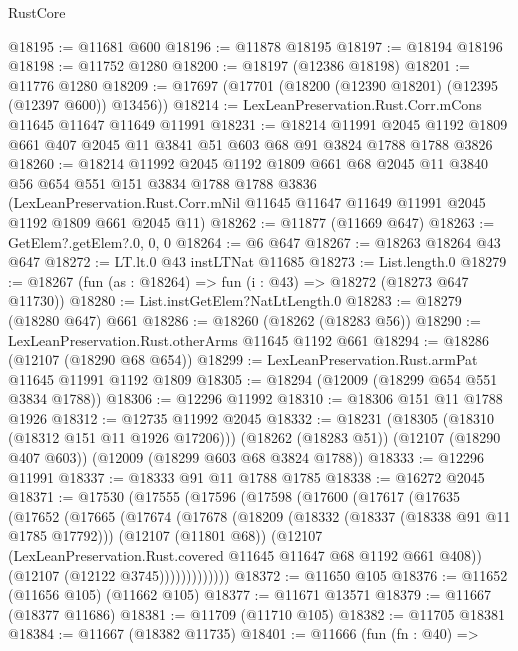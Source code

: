 \begin{lexlean}{RustCore}
\begin{coremodule}
@18195 := @11681 @600
@18196 := @11878 @18195
@18197 := @18194 @18196
@18198 := @11752 @1280
@18200 := @18197 (@12386 @18198)
@18201 := @11776 @1280
@18209 := @17697 (@17701 (@18200 (@12390 @18201) (@12395 (@12397 @600)) @13456))
@18214 := LexLeanPreservation.Rust.Corr.mCons @11645 @11647 @11649 @11991
@18231 := @18214
    @11991
    @2045
    @1192
    @1809
    @661
    @407
    @2045
    @11
    @3841
    @51
    @603
    @68
    @91
    @3824
    @1788
    @1788
    @3826
@18260 := @18214
    @11992
    @2045
    @1192
    @1809
    @661
    @68
    @2045
    @11
    @3840
    @56
    @654
    @551
    @151
    @3834
    @1788
    @1788
    @3836
    (LexLeanPreservation.Rust.Corr.mNil
      @11645
      @11647
      @11649
      @11991
      @2045
      @1192
      @1809
      @661
      @2045
      @11)
@18262 := @11877 (@11669 @647)
@18263 := GetElem?.getElem?.{0, 0, 0}
@18264 := @6 @647
@18267 := @18263 @18264 @43 @647
@18272 := LT.lt.{0} @43 instLTNat @11685
@18273 := List.length.{0}
@18279 := @18267 (fun (as : @18264) => fun (i : @43) => @18272 (@18273 @647 @11730))
@18280 := List.instGetElem?NatLtLength.{0}
@18283 := @18279 (@18280 @647) @661
@18286 := @18260 (@18262 (@18283 @56))
@18290 := LexLeanPreservation.Rust.otherArms @11645 @1192 @661
@18294 := @18286 (@12107 (@18290 @68 @654))
@18299 := LexLeanPreservation.Rust.armPat @11645 @11991 @1192 @1809
@18305 := @18294 (@12009 (@18299 @654 @551 @3834 @1788))
@18306 := @12296 @11992
@18310 := @18306 @151 @11 @1788 @1926
@18312 := @12735 @11992 @2045
@18332 := @18231
    (@18305 (@18310 (@18312 @151 @11 @1926 @17206)))
    (@18262 (@18283 @51))
    (@12107 (@18290 @407 @603))
    (@12009 (@18299 @603 @68 @3824 @1788))
@18333 := @12296 @11991
@18337 := @18333 @91 @11 @1788 @1785
@18338 := @16272 @2045
@18371 := @17530
    (@17555
      (@17596
        (@17598
          (@17600
            (@17617
              (@17635
                (@17652
                  (@17665
                    (@17674
                      (@17678
                        (@18209
                          (@18332 (@18337 (@18338 @91 @11 @1785 @17792)))
                          (@12107 (@11801 @68))
                          (@12107
                            (LexLeanPreservation.Rust.covered @11645 @11647 @68 @1192 @661 @408))
                          (@12107 (@12122 @3745)))))))))))))
@18372 := @11650 @105
@18376 := @11652 (@11656 @105) (@11662 @105)
@18377 := @11671 @13571
@18379 := @11667 (@18377 @11686)
@18381 := @11709 (@11710 @105)
@18382 := @11705 @18381
@18384 := @11667 (@18382 @11735)
@18401 := @11666
    (fun (fn : @40) =>

\end{coremodule}
\end{lexlean}
